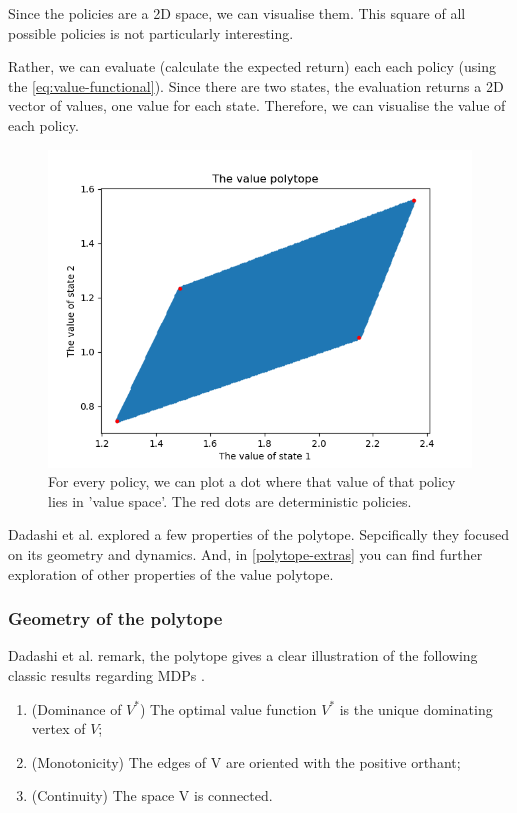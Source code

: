 Since the policies are a 2D space, we can visualise them. This square of all possible policies is not particularly interesting.

Rather, we can evaluate (calculate the expected return) each each policy (using the \eqref{eq:value-functional}).
Since there are two states, the evaluation returns a 2D vector of values, one value for each state.
Therefore, we can visualise the value of each policy.
\begin{figure}[!hb]
\centering
\includegraphics[width=1\textwidth,height=0.5\textheight]{../../pictures/figures/value-polytope.png}
\caption{For every policy, we can plot a dot where that value of that policy lies in 'value space'.
The red dots are deterministic policies.}
\end{figure}

Dadashi et al. \cite{Dadashi2018} explored a few properties of the polytope.
Sepcifically they focused on its geometry and dynamics. And, in
\ref{polytope-extras} you can find further exploration of other properties of the value polytope.

\subsubsection{Geometry of the polytope}

Dadashi et al. remark, the polytope gives a clear illustration of the following classic results regarding MDPs \cite{Bertsekas1996}.

\begin{enumerate}
\tightlist
  \item (Dominance of $V^*$) The optimal value function $V^*$ is the unique dominating vertex of $V$;
  \item (Monotonicity) The edges of V are oriented with the positive orthant;
  \item (Continuity) The space V is connected.
\end{enumerate}

